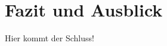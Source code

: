 \documentclass[main.tex]{subfiles}
\begin{document}
\section{Fazit und Ausblick}

Hier kommt der Schluss!
\end{document}
